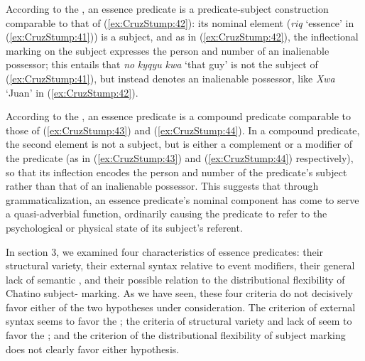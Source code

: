 \documentclass[output=paper]{langsci/langscibook}
\begin{document}
According to the , an essence predicate is a predicate-subject construction comparable to that of  (\ref{ex:CruzStump:42}):  its nominal element (\textit{riq} `essence' in (\ref{ex:CruzStump:41})) is a subject, and as in (\ref{ex:CruzStump:42}), the inflectional marking on the subject expresses the person and number of an inalienable possessor; this entails that \emph{no} \emph{kyqyu}  \emph{kwa} `that guy' is not the subject of (\ref{ex:CruzStump:41}), but instead denotes an inalienable possessor, like \emph{Xwa} `Juan' in (\ref{ex:CruzStump:42}).

According to the , an essence predicate is a compound predicate comparable to those of (\ref{ex:CruzStump:43}) and (\ref{ex:CruzStump:44}).  In a compound predicate, the second element is not a subject, but is either a complement or a modifier of the predicate (as in (\ref{ex:CruzStump:43}) and (\ref{ex:CruzStump:44}) respectively), so that its inflection encodes the person and number of the predicate's subject rather than that of an inalienable possessor.  
This suggests that through grammaticalization, an essence predicate's nominal component has come to serve a quasi-adverbial function, ordinarily causing the predicate to refer to the psychological or physical state of its subject's referent.

In section 3, we examined four characteristics of essence predicates:  their structural variety, their external syntax relative to event modifiers, their general lack of semantic , and their possible relation to the distributional flexibility of Chatino subject- marking.  As we have seen, these four criteria do not decisively favor either of the two hypotheses under consideration.  The criterion of external syntax seems to favor the ; the criteria of structural variety and lack of  seem to favor the ; and the criterion of the distributional flexibility of subject  marking does not clearly favor either hypothesis.
\end{document}
